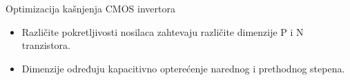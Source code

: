 \begin{frame}[label=09_3-s006]{Optimizacija kašnjenja CMOS invertora}
\begin{itemize}
\item Različite pokretljivosti nosilaca zahtevaju različite dimenzije P i N tranzistora.
\item Dimenzije određuju kapacitivno opterećenje narednog i prethodnog stepena.
\end{itemize}\begin{center}

\end{center}
\end{frame}
